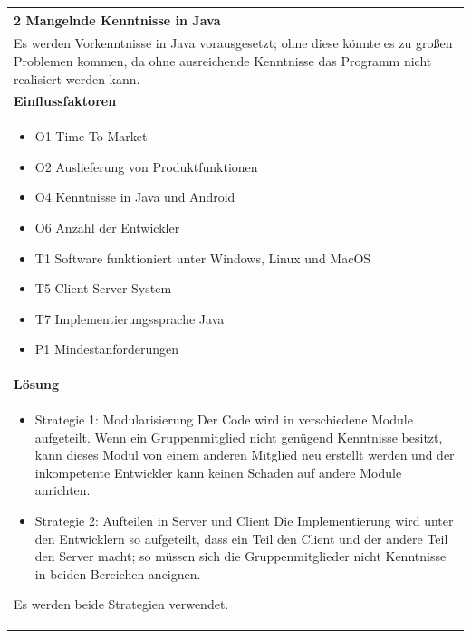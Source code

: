 \documentclass[fontsize=12pt,paper=a4,twoside]{scrartcl}
\begin{document}
\begin{table}[H]
\begin{tabular}{|p{\textwidth}|}\hline
2 Mangelnde Kenntnisse in Java\\ \hline
Es werden Vorkenntnisse in Java vorausgesetzt; ohne diese könnte es zu großen Problemen kommen, da ohne ausreichende Kenntnisse das Programm nicht realisiert werden kann.\\ \hline
\textbf{Einflussfaktoren}\\
\begin{itemize}
\item O1 Time-To-Market
\item O2 Auslieferung von Produktfunktionen
\item O4 Kenntnisse in Java und Android
\item O6 Anzahl der Entwickler
\item T1 Software funktioniert unter Windows, Linux und MacOS
\item T5 Client-Server System
\item T7 Implementierungssprache Java
\item P1 Mindestanforderungen
\end{itemize}\\ \hline
\textbf{Lösung}\\
\begin{itemize}
\item Strategie 1: Modularisierung \leavevmode\newline
Der Code wird in verschiedene Module aufgeteilt. Wenn ein Gruppenmitglied nicht genügend Kenntnisse besitzt, kann dieses Modul von einem anderen Mitglied neu erstellt werden und der inkompetente Entwickler kann keinen Schaden auf andere Module anrichten.
\item Strategie 2: Aufteilen in Server und Client \leavevmode\newline
Die Implementierung wird unter den Entwicklern so aufgeteilt, dass ein Teil den Client und der andere Teil den Server macht; so müssen sich die Gruppenmitglieder nicht Kenntnisse in beiden Bereichen aneignen.
\end{itemize}
Es werden beide Strategien verwendet.\\ \hline
\end{tabular}
\end{table}
\end{document}
